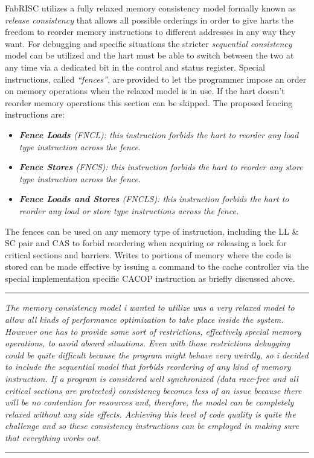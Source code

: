 \documentclass{article}
\begin{document}
            FabRISC utilizes a fully relaxed memory consistency model formally known as \textit{release consistency} that allows all possible orderings in order to give harts the freedom to reorder memory instructions to different addresses in any way they want. For debugging and specific situations the stricter \textit{sequential consistency} model can be utilized and the hart must be able to switch between the two at any time via a dedicated bit in the control and status register. Special instructions, called \textit{``fences''}, are provided to let the programmer impose an order on memory operations when the relaxed model is in use. If the hart doesn't reorder memory operations this section can be skipped. The proposed fencing instructions are:

            \begin{itemize}

                \item \textit{\textbf{Fence Loads} (FNCL): this instruction forbids the hart to reorder any load type instruction across the fence.}

                \item \textit{\textbf{Fence Stores} (FNCS): this instruction forbids the hart to reorder any store type instruction across the fence.}

                \item \textit{\textbf{Fence Loads and Stores} (FNCLS): this instruction forbids the hart to reorder any load or store type instructions across the fence.}

            \end{itemize}

            The fences can be used on any memory type of instruction, including the LL \& SC pair and CAS to forbid reordering when acquiring or releasing a lock for critical sections and barriers. Writes to portions of memory where the code is stored can be made effective by issuing a command to the cache controller via the special implementation specific CACOP instruction as briefly discussed above.

        \par\noindent\rule{\textwidth}{0.4pt}
        \textit{The memory consistency model i wanted to utilize was a very relaxed model to allow all kinds of performance optimization to take place inside the system. However one has to provide some sort of restrictions, effectively special memory operations, to avoid absurd situations. Even with those restrictions debugging could be quite difficult because the program might behave very weirdly, so i decided to include the sequential model that forbids reordering of any kind of memory instruction. If a program is considered well synchronized (data race-free and all critical sections are protected) consistency becomes less of an issue because there will be no contention for resources and, therefore, the model can be completely relaxed without any side effects. Achieving this level of code quality is quite the challenge and so these consistency instructions can be employed in making sure that everything works out.}
        \par\noindent\rule{\textwidth}{0.4pt}
\end{document}
